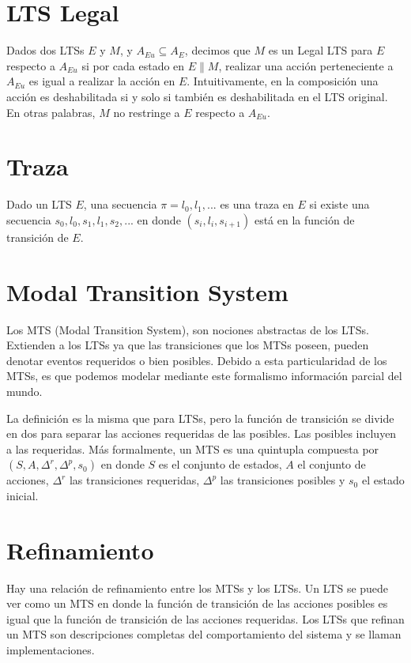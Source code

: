 \section{LTS Legal}
Dados dos LTSs $E$ y $M$, y $A_{Eu} \subseteq A_{E}$, decimos que $M$ es un Legal LTS para $E$ respecto a $A_{Eu}$ si por cada
estado en $E\parallel$$M$, realizar una acción perteneciente a $A_{Eu}$ es igual a realizar la acción en $E$.
Intuitivamente, en la composición una acción es deshabilitada si y solo si también es deshabilitada en el LTS original.
En otras palabras, $M$ no restringe a $E$ respecto a $A_{Eu}$.

\section{Traza}

Dado un LTS $E$, una secuencia $\pi = l_{0}, l_{1}, ...$ es una traza en $E$ si existe una secuencia 
$s_{0}, l_{0}, s_{1}, l_{1}, s_{2}, ...$ en donde $(s_{i}, l_{i}, s_{i + 1})$ está en la función de transición de $E$.

\section{Modal Transition System}
Los MTS (Modal Transition System), son nociones abstractas de los LTSs. Extienden a los LTSs ya que las transiciones 
que los MTSs poseen, pueden denotar eventos requeridos o bien posibles. Debido a esta particularidad de los MTSs, es 
que podemos modelar mediante este formalismo información parcial del mundo.

\vspace{\baselineskip}
La definición es la misma que para LTSs, pero la función de transición se divide en dos para separar las acciones
requeridas de las posibles. Las posibles incluyen a las requeridas.
Más formalmente, un MTS es una quintupla compuesta por $(S, A, \Delta^r, \Delta^p, s_{0})$ en donde $S$ es el
conjunto de estados, $A$ el conjunto de acciones, $\Delta^r$ las transiciones requeridas, $\Delta^p$  las
transiciones posibles y $s_{0}$ el estado inicial.

\section{Refinamiento}

Hay una relación de refinamiento entre los MTSs y los LTSs. Un LTS se puede ver como un MTS en donde la función de
transición de las acciones posibles es igual que la función de transición de las acciones requeridas. Los LTSs que
refinan un MTS son descripciones completas del comportamiento del sistema y se llaman implementaciones.

